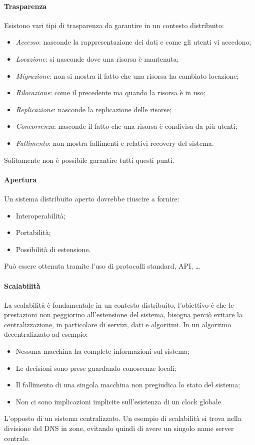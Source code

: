 \paragraph{Trasparenza}
Esistono vari tipi di trasparenza da garantire in un contesto distribuito:
\begin{itemize}
    \item \emph{Accesso}: nasconde la rappresentazione dei dati 
    e come gli utenti vi accedono;
    \item \emph{Locazione}: si nasconde dove una risorsa è mantenuta;
    \item \emph{Migrazione}: non si mostra il fatto che una risorsa ha cambiato 
    locazione;
    \item \emph{Rilocazione}: come il precedente ma quando la risorsa è in uso;
    \item \emph{Replicazione}: nasconde la replicazione delle risorse;
    \item \emph{Concorrenza}: nasconde il fatto che una risorsa è condivisa
    da più utenti;
    \item \emph{Fallimento}: non mostra fallimenti e relativi recovery del sistema.
\end{itemize}
Solitamente non è possibile garantire tutti questi punti.

\paragraph{Apertura}
Un sistema distribuito aperto dovrebbe riuscire a fornire:
\begin{itemize}
    \item Interoperabilità;
    \item Portabilità;
    \item Possibilità di estensione.
\end{itemize}
Può essere ottenuta tramite l'uso di protocolli standard, API, \dots

\paragraph{Scalabilità}
La scalabilità è fondamentale in un contesto distribuito, 
l'obiettivo è che le prestazioni non peggiorino all'estensione
del sistema, bisogna perciò evitare la centralizzazione, 
in particolare di servizi, dati e algoritmi.
In un algoritmo decentralizzato ad esempio:
\begin{itemize}
    \item Nessuna macchina ha complete informazioni sul sistema;
    \item Le decisioni sono prese guardando conoscenze locali;
    \item Il fallimento di una singola macchina non pregiudica lo stato
    del sistema;
    \item Non ci sono implicazioni implicite sull'esistenza di un clock globale.
\end{itemize}
L'opposto di un sistema centralizzato.
Un esempio di scalabilità si trova nella divisione del DNS in zone, 
evitando quindi di avere un singolo name server centrale.

